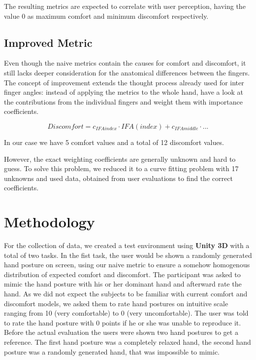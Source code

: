 \documentclass{sig-alternate-05-2015}
\begin{document}
The resulting metrics are expected to correlate with user perception, having the value 0 as maximum comfort and minimum discomfort respectively.


\subsection{Improved Metric}

Even though the naive metrics contain the causes for comfort and discomfort, it still lacks deeper consideration for the anatomical differences between the fingers.
The concept of improvement extends the thought process already used for inter finger angles: instead of applying the metrics to the whole hand, have a look at the contributions from the individual fingers and weight them with importance coefficients. 

	\[
	Discomfort = c_{IFAindex}\cdot IFA(index)  +  c_{IFAmiddle}\cdot...
	\]

In our case we have 5 comfort values and a total of 12 discomfort values. 

However, the exact weighting coefficients are generally unknown and hard to guess. To solve this problem, we reduced it to a curve fitting problem with 17 unknowns and used data, obtained from user evaluations to find the correct coefficients.

\section{Methodology}

For the collection of data, we created a test environment using \textbf{Unity 3D} with a total of two tasks. In the fist task, the user would be shown a randomly generated hand posture on screen, using our naive metric to ensure a somehow homogenous distribution of expected comfort and discomfort. The participant was asked to mimic the hand posture with his or her dominant hand and afterward rate the hand. As we did not expect the subjects to be familiar with current comfort and discomfort models, we asked them to rate hand postures on intuitive scale ranging from 10 (very comfortable) to 0 (very uncomfortable). The user was told to rate the hand posture with 0 points if he or she was unable to reproduce it. Before the actual evaluation the users were shown two hand postures to get a reference. The first hand posture was a completely relaxed hand, the second hand posture was a randomly generated hand, that was impossible to mimic.
\end{document}
